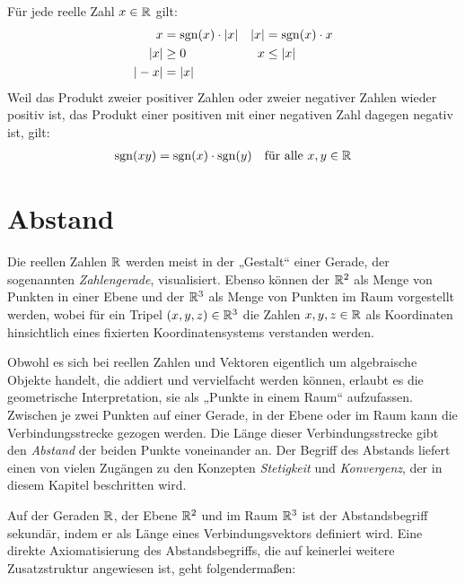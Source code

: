 \begin{bem}
    Für jede reelle Zahl $x\in \mathbb R$ gilt:
    \begin{align*}
        x & = \operatorname{sgn}(x)\cdot \vert x\vert & \vert x \vert & = \operatorname{sgn}(x)\cdot x \\
        \vert x\vert & \ge 0 & x & \le \vert x\vert \\
        \vert -x\vert & = \vert x\vert
    \end{align*}
    Weil das Produkt zweier positiver Zahlen oder zweier negativer Zahlen wieder positiv ist, das Produkt einer positiven mit einer negativen Zahl dagegen negativ ist, gilt:
    \begin{align*}
        \operatorname{sgn}(xy) = \operatorname{sgn}(x)\cdot \operatorname{sgn}(y) && \text{für alle $x,y\in \mathbb R$}
    \end{align*}
\end{bem}





\section{Abstand}


\begin{bem}
    Die reellen Zahlen $\mathbb R$ werden meist in der „Gestalt“ einer Gerade, der sogenannten \emph{Zahlengerade}, visualisiert. Ebenso können der $\mathbb R^2$ als Menge von Punkten in einer Ebene und der $\mathbb R^3$ als Menge von Punkten im Raum vorgestellt werden, wobei für ein Tripel $(x,y,z)\in \mathbb R^3$ die Zahlen $x,y,z\in \mathbb R$ als Koordinaten hinsichtlich eines fixierten Koordinatensystems verstanden werden.
    
    Obwohl es sich bei reellen Zahlen und Vektoren eigentlich um algebraische Objekte handelt, die addiert und vervielfacht werden können, erlaubt es die geometrische Interpretation, sie als „Punkte in einem Raum“ aufzufassen. Zwischen je zwei Punkten auf einer Gerade, in der Ebene oder im Raum kann die Verbindungsstrecke gezogen werden. Die Länge dieser Verbindungsstrecke gibt den \emph{Abstand} der beiden Punkte voneinander an. Der Begriff des Abstands liefert einen von vielen Zugängen zu den Konzepten \emph{Stetigkeit} und \emph{Konvergenz}, der in diesem Kapitel beschritten wird.
    
    Auf der Geraden $\mathbb R$, der Ebene $\mathbb R^2$ und im Raum $\mathbb R^3$ ist der Abstandsbegriff sekundär, indem er als Länge eines Verbindungsvektors definiert wird. Eine direkte Axiomatisierung des Abstandsbegriffs, die auf keinerlei weitere Zusatzstruktur angewiesen ist, geht folgendermaßen:
\end{bem}


